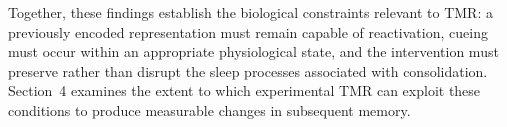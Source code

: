 Together, these findings establish the biological constraints relevant to TMR:
a previously encoded representation must remain capable of reactivation, cueing
must occur within an appropriate physiological state, and the intervention must
preserve rather than disrupt the sleep processes associated with consolidation.
Section~4 examines the extent to which experimental TMR can exploit these
conditions to produce measurable changes in subsequent memory.